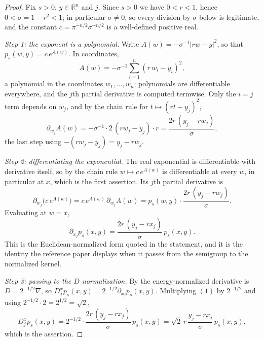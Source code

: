 \begin{proof}
Fix $s>0$, $y \in \mathbb{R}^n$ and $j$.  Since $s>0$ we have $0 < r < 1$, hence
$0 < \sigma = 1-r^2 < 1$; in particular $\sigma \neq 0$, so every division by
$\sigma$ below is legitimate, and the constant
$c = \pi^{-n/2}\sigma^{-n/2}$ is a well-defined positive real.

\emph{Step 1: the exponent is a polynomial.}
Write $A(w) = -\sigma^{-1}|rw-y|^2$, so that $p_s(w,y) = c\,e^{A(w)}$.  In
coordinates,
\[
  A(w) = -\sigma^{-1}\sum_{i=1}^n (r\,w_i - y_i)^2 ,
\]
a polynomial in the coordinates $w_1,\ldots,w_n$; polynomials are differentiable
everywhere, and the $j$th partial derivative is computed termwise.  Only the
$i = j$ term depends on $w_j$, and by the chain rule for $t \mapsto (rt-y_j)^2$,
\[
  \partial_{w_j}A(w)
    = -\sigma^{-1}\cdot 2\,(r w_j - y_j)\cdot r
    = \frac{2r\,(y_j - r w_j)}{\sigma} ,
\]
the last step using $-(rw_j - y_j) = y_j - r w_j$.

\emph{Step 2: differentiating the exponential.}
The real exponential is differentiable with derivative itself, so by the chain
rule $w \mapsto c\,e^{A(w)}$ is differentiable at every $w$, in particular at
$x$, which is the first assertion.  Its $j$th partial derivative is
\[
  \partial_{w_j}\bigl(c\,e^{A(w)}\bigr)
    = c\,e^{A(w)}\,\partial_{w_j}A(w)
    = p_s(w,y)\cdot\frac{2r\,(y_j - r w_j)}{\sigma} .
\]
Evaluating at $w = x$,
\begin{equation*}
  \partial_{x_j}p_s(x,y)
    = \frac{2r\,(y_j - r x_j)}{\sigma}\,p_s(x,y) . \tag{1}
\end{equation*}
This is the Euclidean-normalized form quoted in the statement, and it is the
identity the reference paper displays when it passes from the semigroup to the
normalized kernel.

\emph{Step 3: passing to the $D$ normalization.}
By  the energy-normalized derivative is $D = 2^{-1/2}\nabla$, so
$D_j^x p_s(x,y) = 2^{-1/2}\partial_{x_j}p_s(x,y)$.  Multiplying $(1)$ by
$2^{-1/2}$ and using $2^{-1/2}\cdot 2 = 2^{1/2} = \sqrt2$,
\[
  D_j^x p_s(x,y)
    = 2^{-1/2}\cdot\frac{2r\,(y_j-rx_j)}{\sigma}\,p_s(x,y)
    = \sqrt2\,r\,\frac{y_j - r x_j}{\sigma}\,p_s(x,y) ,
\]
which is the assertion.
\end{proof}
